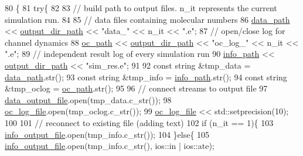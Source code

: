 \begin{DoxyCode}
80 \{
81     \textcolor{keywordflow}{try}\{
82 
83 \textcolor{comment}{//      build path to output files. n\_it represents the current simulation run.}
84 
85 \textcolor{comment}{//      data files containing molecular numbers}
86         \hyperlink{classnw_1_1_gillespie___sys_a989a4288ca9dd4eaf9a5ef45c805260e}{data\_path} << \hyperlink{classnw_1_1_gillespie___sys_a07aa57de819107467a13af8ceadb4be9}{output\_dir\_path} << \textcolor{stringliteral}{"data\_"} << n\_it << \textcolor{stringliteral}{".e"};
87 \textcolor{comment}{//      open/close log for channel dynamics}
88         \hyperlink{classnw_1_1_gillespie___sys_ab1709cadc7e452ec3834ac66a3354203}{oc\_path} << \hyperlink{classnw_1_1_gillespie___sys_a07aa57de819107467a13af8ceadb4be9}{output\_dir\_path} << \textcolor{stringliteral}{"oc\_log\_"} << n\_it << \textcolor{stringliteral}{".e"};
89 \textcolor{comment}{//      independent result log of every simulation run}
90         \hyperlink{classnw_1_1_gillespie___sys_a24b051d05da3cc35a983536371522e2c}{info\_path} << \hyperlink{classnw_1_1_gillespie___sys_a07aa57de819107467a13af8ceadb4be9}{output\_dir\_path} << \textcolor{stringliteral}{"sim\_res.e"};
91 
92         \textcolor{keyword}{const} \textcolor{keywordtype}{string} &tmp\_data = \hyperlink{classnw_1_1_gillespie___sys_a989a4288ca9dd4eaf9a5ef45c805260e}{data\_path}.str();
93         \textcolor{keyword}{const} \textcolor{keywordtype}{string} &tmp\_info = \hyperlink{classnw_1_1_gillespie___sys_a24b051d05da3cc35a983536371522e2c}{info\_path}.str();
94         \textcolor{keyword}{const} \textcolor{keywordtype}{string} &tmp\_oclog = \hyperlink{classnw_1_1_gillespie___sys_ab1709cadc7e452ec3834ac66a3354203}{oc\_path}.str();
95 
96 \textcolor{comment}{//      connect streams to output file}
97         \hyperlink{classnw_1_1_gillespie___sys_aec438472b938a410f0d31af0ae73a164}{data\_output\_file}.open(tmp\_data.c\_str());
98         \hyperlink{classnw_1_1_gillespie___sys_a4209e0d87ac2e0c5b9cad1074a900c80}{oc\_log\_file}.open(tmp\_oclog.c\_str());
99         \hyperlink{classnw_1_1_gillespie___sys_a4209e0d87ac2e0c5b9cad1074a900c80}{oc\_log\_file} << std::setprecision(10);
100 
101 \textcolor{comment}{//      reconnect to existing file (adding text)}
102         \textcolor{keywordflow}{if} (n\_it == 1)\{
103             \hyperlink{classnw_1_1_gillespie___sys_a1137e63fe12d34f81110bf5e8ebe856c}{info\_output\_file}.open(tmp\_info.c\_str());
104         \}\textcolor{keywordflow}{else}\{
105             \hyperlink{classnw_1_1_gillespie___sys_a1137e63fe12d34f81110bf5e8ebe856c}{info\_output\_file}.open(tmp\_info.c\_str(), ios::in | ios::ate);

\end{DoxyCode}
